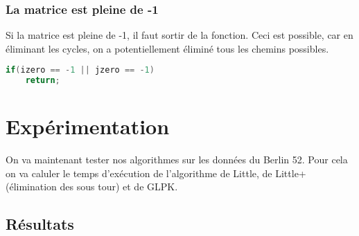 \documentclass[11pt]{article}
\begin{document}
\subsubsection{La matrice est pleine de -1}

Si la matrice est pleine de -1, il faut sortir de la fonction. Ceci est possible, car en éliminant les cycles, on a potentiellement éliminé tous les chemins possibles.
\begin{lstlisting}[language=C]
if(izero == -1 || jzero == -1)
    return;
\end{lstlisting}

\section{Expérimentation}

On va maintenant tester nos algorithmes sur les données du Berlin 52. Pour cela on va caluler le temps d'exécution de l'algorithme de Little, de Little+ (élimination des sous tour) et de GLPK.

\subsection{Résultats}
\end{document}
